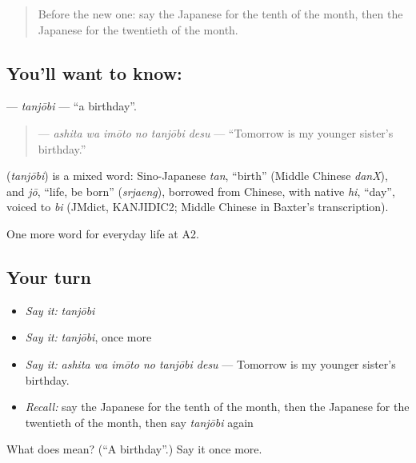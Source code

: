 \label{lesson:JA-C165-tanjoubi}



\begin{quote}
Before the new one: say the Japanese for the tenth of the month, then the Japanese for the twentieth of the month.
\end{quote}

\subsection*{You'll want to know: }
\textbf{} — \emph{tanjōbi} — \textquotedblleft{}a birthday\textquotedblright{}.

\begin{quote}
\textbf{  } — \emph{ashita wa imōto no tanjōbi desu} — \textquotedblleft{}Tomorrow is my younger sister's birthday.\textquotedblright{}
\end{quote}

\begin{cousinweb}
\textbf{} (\emph{tanjōbi}) is a mixed word: Sino-Japanese \emph{tan}, \textquotedblleft{}birth\textquotedblright{} (Middle Chinese \emph{danX}), and \emph{jō}, \textquotedblleft{}life, be born\textquotedblright{} (\emph{srjaeng}), borrowed from Chinese, with native \emph{hi}, \textquotedblleft{}day\textquotedblright{}, voiced to \emph{bi} (JMdict, KANJIDIC2; Middle Chinese in Baxter's transcription).
\end{cousinweb}

\begin{grammarlens}[title={What you've built}]
One more word for everyday life at A2.
\end{grammarlens}

\subsection*{Your turn}
\begin{itemize}
\raggedright
  \item \emph{Say it:} \emph{tanjōbi}
  \item \emph{Say it:} \emph{tanjōbi}, once more
  \item \emph{Say it:} \emph{ashita wa imōto no tanjōbi desu} — Tomorrow is my younger sister's birthday.
  \item \emph{Recall:} say the Japanese for the tenth of the month, then the Japanese for the twentieth of the month, then say \emph{tanjōbi} again
\end{itemize}

\begin{tcolorbox}[breakable,colback=teal!4,colframe=teal!35!black,title={Before you move on}]
What does  mean? (\textquotedblleft{}A birthday\textquotedblright{}.) Say it once more.
\end{tcolorbox}
